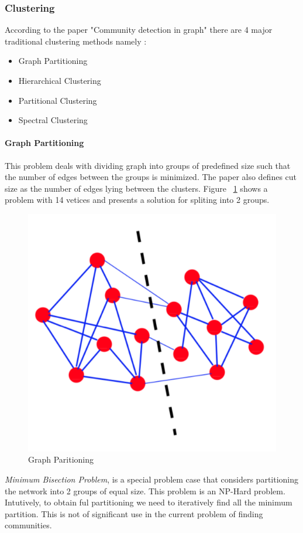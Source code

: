 \subsubsection{Clustering}
According to the paper "Community detection in graph" \cite{communitypaper} there are 4 major traditional clustering methods namely : 
\begin{itemize}

\item Graph Partitioning 

\item Hierarchical Clustering

\item Partitional Clustering

\item Spectral Clustering

\end{itemize}

\paragraph{Graph Partitioning}
This problem deals with dividing graph into groups of predefined size such that the number of edges between the groups is minimized. The paper \cite{communitypaper}  also defines cut size as the number of edges lying between the clusters.  Figure ~\ref{grapar} shows a problem with 14 vetices and presents a solution for spliting into 2 groups. 
\begin{figure}[H]
\centering
\includegraphics[scale=0.3]{graphpart.png}
\caption{\label{grapar}Graph Paritioning \cite{communitypaper}}

\end{figure}
\par \textit{Minimum Bisection Problem}, is a special problem case that considers partitioning the network into 2 groups of equal size. This problem is an NP-Hard problem. Intutively, to obtain ful partitioning we need to iteratively find all the minimum partition. This is not of significant use in the current problem of finding communities. 
